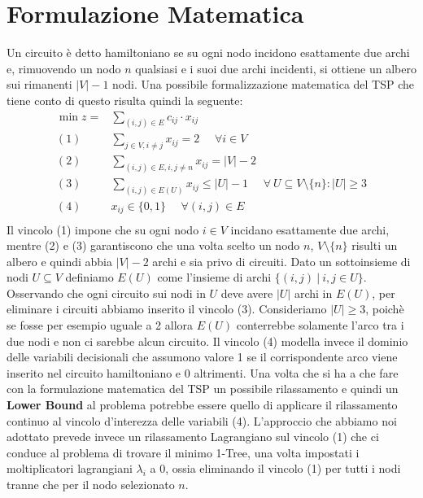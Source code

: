 \documentclass[
    article,            %
    12pt,                %
    oneside,            %
    a4paper,            %
    english,            %
    italian,                %
    sumario=tradicional,
]{abntex2}
\begin{document}
    \section{Formulazione Matematica}\label{sec:formulazione-matematica}
    Un circuito è detto hamiltoniano se su ogni nodo incidono esattamente due archi e, rimuovendo un nodo $n$ qualsiasi e i suoi due archi incidenti, si ottiene un albero sui rimanenti $|V| - 1$ nodi.
    Una possibile formalizzazione matematica del TSP che tiene conto di questo risulta quindi la seguente:
    \begin{equation*}
        \begin{split}
            \min z = & \sum_{(i,j) \in E} c_{ij} \cdot x_{ij}\\
            (1)\:\:\:\:\:\: & \sum_{j \in V, i \neq j} x_{ij} = 2 \:\:\:\:\:\: \forall i \in V \\
            (2) \:\:\:\:\:\: & \sum_{(i,j)\in E, i, j \neq n} x_{ij} = |V|-2 \\
            (3) \:\:\:\:\:\: & \sum_{(i,j) \in E(U)} x_{ij} \leq |U| - 1 \:\:\:\:\:\: \forall\: U \subseteq V\setminus\{n\} : |U| \geq 3 \\
            (4) \:\:\:\:\:\: & x_{ij} \in \{0,1\} \:\:\:\:\:\: \forall (i,j) \in E\\
        \end{split}
    \end{equation*}
    Il vincolo (1) impone che su ogni nodo $i \in V$ incidano esattamente due archi, mentre (2) e (3) garantiscono che una volta scelto un nodo $n$, $V \setminus \{n\}$ risulti un albero e quindi abbia $|V|-2$ archi e sia privo di circuiti.
    \newline
    Dato un sottoinsieme di nodi $U \subseteq V$ definiamo $E(U)$ come l'insieme di archi $\{ (i,j) \:|\: i,j \in U \}$.
    Osservando che ogni circuito sui nodi in $U$ deve avere $|U|$ archi in $E(U)$, per eliminare i circuiti abbiamo inserito il vincolo (3).
    Consideriamo $|U| \geq 3$, poichè se fosse per esempio uguale a 2 allora $E(U)$ conterrebbe solamente l'arco tra i due nodi e non ci sarebbe alcun circuito.
    Il vincolo (4) modella invece il dominio delle variabili decisionali che assumono valore 1 se il corrispondente arco viene inserito nel circuito hamiltoniano e 0 altrimenti.
    \newline
    Una volta che si ha a che fare con la formulazione matematica del TSP un possibile rilassamento e quindi un \textbf{Lower Bound} al problema potrebbe essere quello di applicare il rilassamento continuo al vincolo d'interezza delle variabili (4).
    \newline
    L'approccio che abbiamo noi adottato prevede invece un rilassamento Lagrangiano sul vincolo (1) che ci conduce al problema di trovare il minimo 1-Tree, una volta impostati i moltiplicatori lagrangiani $\lambda_i$ a 0, ossia eliminando il vincolo (1) per tutti i nodi tranne che per il nodo selezionato $n$.
\end{document}
